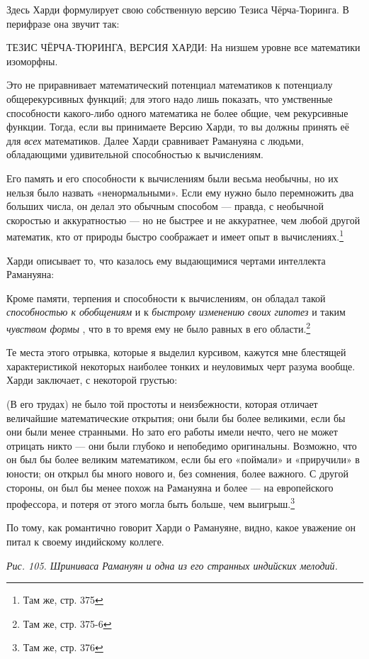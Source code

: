 \documentclass[../main.tex]{subfiles}
\begin{document}
Здесь Харди формулирует свою собственную версию Тезиса Чёрча-Тюринга. В перифразе она звучит так:

ТЕЗИС ЧЁРЧА-ТЮРИНГА, ВЕРСИЯ ХАРДИ: На низшем уровне все математики изоморфны.

Это не приравнивает математический потенциал математиков к потенциалу общерекурсивных функций; для этого надо лишь показать, что умственные способности какого-либо одного математика не более общие, чем рекурсивные функции. Тогда, если вы принимаете Версию Харди, то вы должны принять её для \emph{всех} математиков. Далее Харди сравнивает Рамануяна с людьми, обладающими удивительной способностью к вычислениям.

Его память и его способности к вычислениям были весьма необычны, но их нельзя было назвать «ненормальными». Если ему нужно было перемножить два больших числа, он делал это обычным способом --- правда, с необычной скоростью и аккуратностью --- но не быстрее и не аккуратнее, чем любой другой математик, кто от природы быстро соображает и имеет опыт в вычислениях.\footnote{Там же, стр. 375}

Харди описывает то, что казалось ему выдающимися чертами интеллекта Рамануяна:

Кроме памяти, терпения и способности к вычислениям, он обладал такой \emph{способностью к обобщениям} и к \emph{быстрому изменению своих гипотез} и таким \emph{чувством формы} , что в то время ему не было равных в его области.\footnote{Там же, стр. 375-6}

Те места этого отрывка, которые я выделил курсивом, кажутся мне блестящей характеристикой некоторых наиболее тонких и неуловимых черт разума вообще. Харди заключает, с некоторой грустью:

(В его трудах) не было той простоты и неизбежности, которая отличает величайшие математические открытия; они были бы более великими, если бы они были менее странными. Но зато его работы имели нечто, чего не может отрицать никто --- они были глубоко и непобедимо оригинальны. Возможно, что он был бы более великим математиком, если бы его «поймали» и «приручили» в юности; он открыл бы много нового и, без сомнения, более важного. С другой стороны, он был бы менее похож на Рамануяна и более --- на европейского профессора, и потеря от этого могла быть больше, чем выигрыш.\footnote{Там же, стр. 376}

По тому, как романтично говорит Харди о Рамануяне, видно, какое уважение он питал к своему индийскому коллеге.

\emph{Рис. 105. Шриниваса Рамануян и одна из его странных индийских мелодий.}
\end{document}
